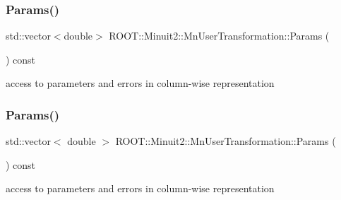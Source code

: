 \mbox{\label{classROOT_1_1Minuit2_1_1MnUserTransformation_a6b95cc35815242b67b6bcc2a37d5e51a}} 
\subsubsection{\texorpdfstring{Params()}{Params()}\hspace{0.1cm}{\footnotesize\ttfamily [1/2]}}
{\footnotesize\ttfamily std\+::vector$<$double$>$ R\+O\+O\+T\+::\+Minuit2\+::\+Mn\+User\+Transformation\+::\+Params (\begin{DoxyParamCaption}{ }\end{DoxyParamCaption}) const}



access to parameters and errors in column-\/wise representation 

\mbox{\label{classROOT_1_1Minuit2_1_1MnUserTransformation_a85477022b0cfb39ccfe69a46cdaffe73}} 
\subsubsection{\texorpdfstring{Params()}{Params()}\hspace{0.1cm}{\footnotesize\ttfamily [2/2]}}
{\footnotesize\ttfamily std\+::vector$<$ double $>$ R\+O\+O\+T\+::\+Minuit2\+::\+Mn\+User\+Transformation\+::\+Params (\begin{DoxyParamCaption}{ }\end{DoxyParamCaption}) const}



access to parameters and errors in column-\/wise representation 


